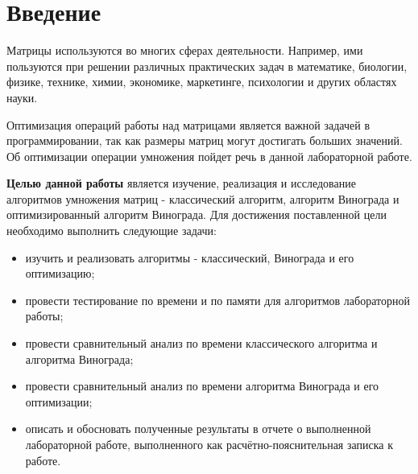 \chapter*{Введение}

Матрицы используются во многих сферах деятельности. Например, ими пользуются при решении различных практических задач в математике, биологии, физике, технике, химии, экономике, маркетинге, психологии и других областях науки. 

Оптимизация операций работы над матрицами является важной задачей в программировании, так как размеры матриц могут достигать больших значений. Об оптимизации операции умножения пойдет речь в данной лабораторной работе.


\textbf{Целью данной работы} является изучение, реализация и исследование алгоритмов умножения матриц - классический алгоритм, алгоритм Винограда и оптимизированный алгоритм Винограда. 
Для достижения поставленной цели необходимо выполнить следующие задачи:
\begin{itemize}
	\item изучить и реализовать алгоритмы - классический, Винограда и его оптимизацию;
    \item провести тестирование по времени и по памяти для алгоритмов лабораторной работы;
    \item провести сравнительный анализ по времени классического алгоритма и алгоритма Винограда;
    \item провести сравнительный анализ по времени алгоритма Винограда и его оптимизации;
	\item описать и обосновать полученные результаты в отчете о выполненной лабораторной работе, выполненного как расчётно-пояснительная записка к работе.
\end{itemize}
